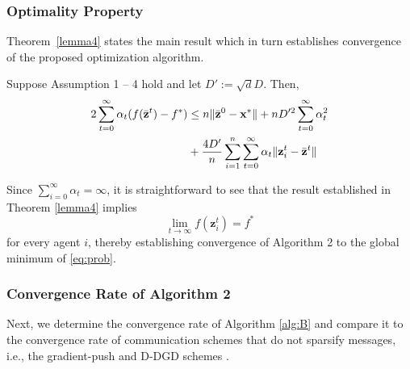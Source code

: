 \subsubsection{Optimality Property}
Theorem~\ref{lemma4} states the main result which in turn establishes convergence of the proposed optimization algorithm. 
\begin{theorem}\label{lemma4}
Suppose Assumption 1 -- 4 hold and let $D':=\sqrt{d}D$. 
Then, 
\begin{equation}
  \begin{aligned}
    2\sum_{t=0}^{\infty}\alpha_t (f(\Bar{\mathbf{z}}^t)-f^*) & \leq n\|\Bar{\mathbf{z}}^0 -\mathbf{x}^*\| + nD'^2\sum_{t=0}^{\infty}\alpha_t^2 \\
    & +\frac{4D'}{n}\sum_{i=1}^n \sum_{t=0}^{\infty} \alpha_t \| \mathbf{z}_i^t-\Bar{\mathbf{z}}^t\|
\end{aligned}  
\end{equation}
\end{theorem}
Since $\sum_{i=0}^{\infty}\alpha_t=\infty$, it is straightforward to see that the result established in Theorem  \ref{lemma4} implies 
\begin{equation}
\lim_{t \to \infty}f(\mathbf{z}_i^t)=f^*
\end{equation}
for every agent $i$, thereby establishing convergence of Algorithm 2 to the global minimum of \eqref{eq:prob}.
\subsubsection{Convergence Rate of Algorithm 2} 
Next, we determine the convergence rate of Algorithm \ref{alg:B} and compare it to the convergence rate of communication schemes that do not sparsify messages, i.e., the gradient-push and D-DGD schemes \cite{nedic2014distributed,xi2017distributed}.

